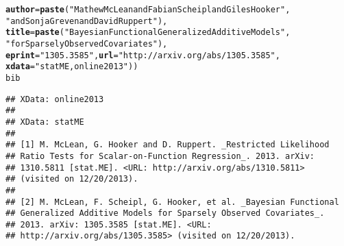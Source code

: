\documentclass[article]{jss}\usepackage[]{graphicx}\usepackage[]{color}
\makeatletter
\newcommand{\hlstr}[1]{\textcolor[rgb]{0.125,0.125,1}{#1}}%
\newcommand{\hlstd}[1]{\textcolor[rgb]{0.251,0.251,0.282}{#1}}%
\newcommand{\hlkwc}[1]{\textcolor[rgb]{0.529,0,0.184}{\textbf{#1}}}%
\newcommand{\hlkwd}[1]{\textcolor[rgb]{0.251,0.251,0.282}{\textbf{#1}}}%
\newenvironment{kframe}{%
 \def\at@end@of@kframe{}%
 \ifinner\ifhmode%
  \def\at@end@of@kframe{\end{minipage}}%
  \begin{minipage}{\columnwidth}%
 \fi\fi%
 \def\FrameCommand##1{\hskip\@totalleftmargin \hskip-\fboxsep
 \colorbox{shadecolor}{##1}\hskip-\fboxsep
     \hskip-\linewidth \hskip-\@totalleftmargin \hskip\columnwidth}%
 \MakeFramed {\advance\hsize-\width
   \@totalleftmargin\z@ \linewidth\hsize
   \@setminipage}}%
 {\par\unskip\endMakeFramed%
 \at@end@of@kframe}
\newenvironment{knitrout}{}{} %
\makeatother
\begin{document}
\begin{knitrout}
\begin{kframe}
\begin{alltt}
  \hlkwc{author} \hlstd{=} \hlkwd{paste}\hlstd{(}\hlstr{"Mathew McLean and Fabian Scheipl and Giles Hooker"}\hlstd{,}
                \hlstr{"and Sonja Greven and David Ruppert"}\hlstd{),}
  \hlkwc{title} \hlstd{=} \hlkwd{paste}\hlstd{(}\hlstr{"Bayesian Functional Generalized Additive Models"}\hlstd{,}
               \hlstr{"for Sparsely Observed Covariates"}\hlstd{),}
  \hlkwc{eprint} \hlstd{=} \hlstr{"1305.3585"}\hlstd{,} \hlkwc{url} \hlstd{=} \hlstr{"http://arxiv.org/abs/1305.3585"}\hlstd{,}
  \hlkwc{xdata} \hlstd{=} \hlstr{"statME,online2013"}\hlstd{))}
\hlstd{bib}
\end{alltt}
\begin{verbatim}
## XData: online2013
## 
## XData: statME
## 
## [1] M. McLean, G. Hooker and D. Ruppert. _Restricted Likelihood
## Ratio Tests for Scalar-on-Function Regression_. 2013. arXiv:
## 1310.5811 [stat.ME]. <URL: http://arxiv.org/abs/1310.5811>
## (visited on 12/20/2013).
## 
## [2] M. McLean, F. Scheipl, G. Hooker, et al. _Bayesian Functional
## Generalized Additive Models for Sparsely Observed Covariates_.
## 2013. arXiv: 1305.3585 [stat.ME]. <URL:
## http://arxiv.org/abs/1305.3585> (visited on 12/20/2013).
\end{verbatim}
\end{kframe}
\end{knitrout}
\end{document}
